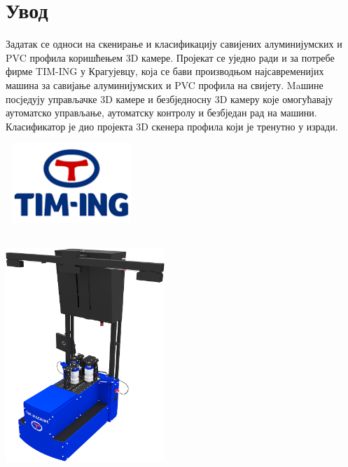 \documentclass[12pt]{article}
\begin{document}
\tableofcontents
\newpage

\section{Увод}
\justifying
Задатак се односи на скенирање и класификацију савијених алуминијумских и PVC профила коришћењем 3D камере. Пројекат се уједно ради и за потребе фирме TIM-ING у Крагујевцу, која се бави производњом најсавременијих машина за савијање алуминијумских и PVC профила на свијету. Maшине посједују управљачке 3D камере и безбједносну 3D камеру које омогућавају аутоматско управљање, аутоматску контролу и безбједан рад на машини. Класификатор је дио пројекта 3D скенера профила који је тренутно у изради.\\
\vspace{0.5cm}
\begin{center}
    \centering 
    \includegraphics[height=3cm, width=5cm]{images/TIM-ING_logo.png}
\end{center}
\vspace{0.5cm}
\vspace{0.5cm}
\begin{center}
    \centering 
    \includegraphics[height=9cm, width=6cm]{images/Masina_MODEL-M-CNC-3D.png}
\end{center}
\vspace{0.5cm}
\end{document}
